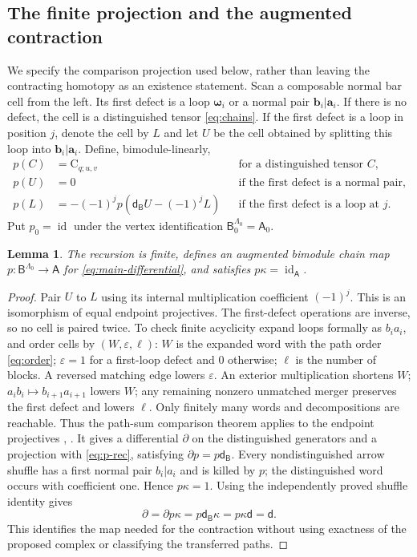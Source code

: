 \documentclass[a4paper,11pt,oneside,reqno]{amsart}
\newtheorem{lemma}[theorem]{Lemma}
\theoremstyle{definition}
\numberwithin{equation}{section}
\begin{document}
\subsection{The finite projection and the augmented contraction}\label{sec:matching}
We specify the comparison projection used below, rather than leaving the
contracting homotopy as an existence statement. Scan a composable normal
bar cell from the left. Its first defect is a loop $\boldsymbol\omega_i$
or a normal pair $\mathbf b_i|\mathbf a_i$. If there is no defect,
the cell is a distinguished tensor \eqref{eq:chains}. If the first defect
is a loop in position $j$, denote the cell by $L$ and let $U$ be the
cell obtained by splitting this loop into $\mathbf b_i|\mathbf a_i$.
Define, bimodule-linearly,
\begin{equation}\label{eq:p-rec}
 \begin{aligned}
 p(C)&=\mathrm C_{q;u,v}&&\text{for a distinguished tensor }C,\\
 p(U)&=0&&\text{if the first defect is a normal pair},\\
 p(L)&=-(-1)^j p(\mathsf d_{\mathsf B}U-(-1)^jL)
 &&\text{if the first defect is a loop at }j.
 \end{aligned}
\end{equation}
Put $p_0=\operatorname{id}$ under the vertex identification
$\mathsf B_0^{\Lambda_0}=\mathsf A_0$.

\begin{lemma}\label{lem:matching}\label{lem:pkappa}
The recursion is finite, defines an augmented bimodule chain map
$p:\mathsf B^{\Lambda_0}\to\mathsf A$ for \eqref{eq:main-differential},
and satisfies $p\kappa=\operatorname{id}_{\mathsf A}$.
\end{lemma}
\begin{proof}
Pair $U$ to $L$ using its internal multiplication coefficient $(-1)^j$.
This is an isomorphism of equal endpoint projectives. The first-defect
operations are inverse, so no cell is paired twice. To check finite
acyclicity expand loops formally as $b_i a_i$, and order cells by
$(W,\varepsilon,\ell)$: $W$ is the expanded word with the path order
\eqref{eq:order}; $\varepsilon=1$ for a first-loop defect and $0$
otherwise; $\ell$ is the number of blocks. A reversed matching edge
lowers $\varepsilon$. An exterior multiplication shortens $W$;
$a_i b_i\mapsto b_{i+1}a_{i+1}$ lowers $W$; any remaining nonzero
unmatched merger preserves the first defect and lowers $\ell$.
Only finitely many words and decompositions are reachable. Thus the
path-sum comparison theorem applies to the endpoint projectives
\cite[Appendix~B]{JollenbeckWelker}, \cite[Theorem~3.3]{CLZ}.
It gives a differential $\partial$ on the distinguished generators and
a projection with \eqref{eq:p-rec}, satisfying
$\partial p=p\mathsf d_{\mathsf B}$.
Every nondistinguished arrow shuffle has a first normal pair $b_i|a_i$
and is killed by $p$; the distinguished word occurs with coefficient one.
Hence $p\kappa=1$. Using the independently proved shuffle identity gives
\[
 \partial=\partial p\kappa=p\mathsf d_{\mathsf B}\kappa
 =p\kappa\mathsf d=\mathsf d.
\]
This identifies the map needed for the contraction without using
exactness of the proposed complex or classifying the transferred paths.
\end{proof}
\end{document}
